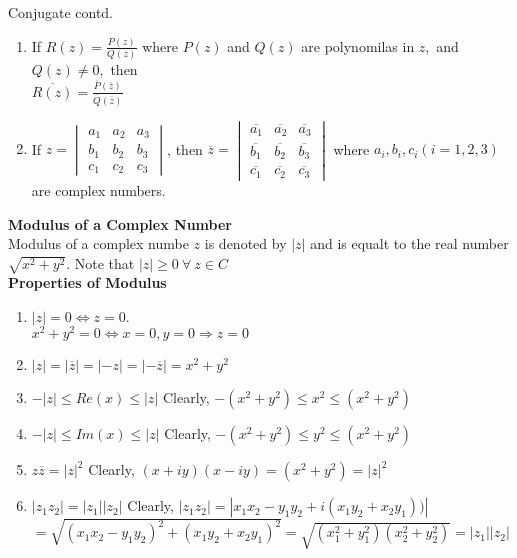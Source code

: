 \documentclass[aspectratio=169,8pt]{beamer}
\newcounter{counter}
\begin{document}
\begin{frame}{Conjugate contd.}
  \begin{enumerate}
    \setcounter{enumi}{\value{counter}}
  \item If $R(z) = \frac{P(z)}{Q(z)}$ where $P(z)$ and $Q(z)$ are polynomilas in $z,$ and $Q(z)\neq 0,$ then\\
    $\overline{R(z)} = \frac{\overline{P}(\overline{z})}{\overline{Q}(\overline{z})}$
  \item If $z = \begin{vmatrix}a_1 & a_2 & a_3\\b_1 & b_2 & b_3\\c_1 & c_2 & c_3\end{vmatrix}$, then $\overline{z} = \begin{vmatrix}\overline{a_1} & \overline{a_2} & \overline{a_3}\\\overline{b_1} & \overline{b_2} & \overline{b_3}\\\overline{c_1} & \overline{c_2} & \overline{c_3}\end{vmatrix}$ where $a_i, b_i, c_i(i = 1,2,3)$ are complex numbers.
  \end{enumerate}
  \vspace*{0.2cm}
  \textbf{\large{Modulus of a Complex Number}}\\
  \vspace*{0.2cm}
  Modulus of a complex numbe $z$ is denoted by $|z|$ and is equalt to the real number $\sqrt{x^2 + y^2}$. Note that $|z|\geq 0~\forall~z\in C$\\
  \vspace*{0.2cm}
  \textbf{Properties of Modulus}\\
  \vspace*{0.2cm}
  \begin{enumerate}
  \item $|z| = 0 \Leftrightarrow z = 0.$\\
    $x^2 + y^2 = 0 \Leftrightarrow x = 0, y = 0 \Rightarrow z = 0$
  \item $|z| = |\overline{z}| = |-z| = |-\overline{z}| = x^2 + y^2$
  \item $-|z|\leq Re(x)\leq |z|$ Clearly, $-(x^2 + y^2) \leq x^2 \leq (x^2 + y^2)$
  \item $-|z|\leq Im(x)\leq |z|$ Clearly, $-(x^2 + y^2) \leq y^2 \leq (x^2 + y^2)$
  \item $z\overline{z} = |z|^2$ Clearly, $(x + iy)(x - iy) = (x^2 + y^2) = |z|^2$
  \item $|z_1z_2| = |z_1||z_2|$ Clearly, $|z_1z_2| = |x_1x_2 - y_1y_2 + i(x_1y_2 + x_2y_1))|$\\
    $= \sqrt{(x_1x_2 - y_1y_2)^2 + (x_1y_2 + x_2y_1)^2} = \sqrt{(x_1^2 + y_1^2)(x_2^2 + y_2^2)} = |z_1||z_2|$
    \setcounter{enumi}{\value{counter}}
  \end{enumerate}
\end{frame}
\end{document}
